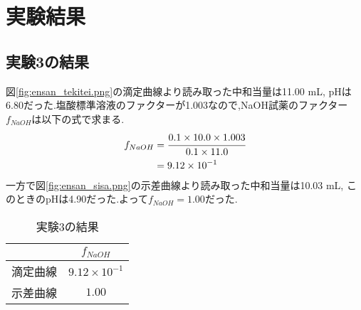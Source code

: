 \section{実験結果}
\subsection{実験3の結果}
図\ref{fig:ensan_tekitei.png}の滴定曲線より読み取った中和当量は11.00 \si{\milli L}, pHは6.80だった.塩酸標準溶液のファクターが1.003なので,NaOH試薬のファクター$f_{NaOH}$は以下の式で求まる.
\begin{align*}
  f_{NaOH}&=\cfrac{0.1\times 10.0\times 1.003}{0.1\times 11.0}\\
  &=9.12\times10^{-1}
\end{align*}
一方で図\ref{fig:ensan_sisa.png}の示差曲線より読み取った中和当量は10.03 \si{\milli L}, このときのpHは4.90だった.よって$f_{NaOH}=1.00$だった.
\begin{table}[h]
   \caption{実験3の結果}
   \label{tab:jikken3kekka}
   \centering
   \begin{tabular}{lc}
     \hline
     &$f_{NaOH}$\\
     \hline \hline
     滴定曲線&$9.12\times10^{-1}$\\
     示差曲線&$1.00$\\
     \hline
   \end{tabular}
\end{table}\\
